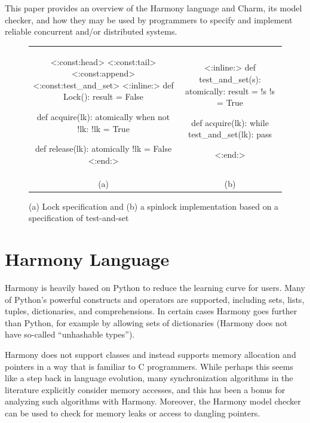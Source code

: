 \documentclass[twocolumn]{article}
\begin{document}
This paper provides an overview of the Harmony language and Charm,
its model checker, and how they may be used by programmers to
specify and implement reliable concurrent and/or distributed systems.

\begin{figure}[h]
\begin{center}
\begin{tabular}{cc}
{\footnotesize
\begin{tcolorbox}[width=0.45\linewidth]
<{:const:head}>
<{:const:tail}>
<{:const:append}>
<{:const:test_and_set}>
<{:inline:}>
def Lock():
    result = False

def acquire(lk):
    atomically when not !lk:
        !lk = True

def release(lk):
    atomically !lk = False
<{:end:}>
\end{tcolorbox}
}
&
{\footnotesize
\begin{tcolorbox}[width=0.45\linewidth]
<{:inline:}>
def test_and_set(s):
    atomically:
        result = !s
        !s = True

def acquire(lk):
    while test_and_set(lk):
        pass

<{:end:}>
\end{tcolorbox}
}
\\
(a) & (b)
\end{tabular}
\end{center}
\caption{(a) Lock specification and (b) a spinlock implementation based on
a specification of test-and-set}
\label{fig:synch}
\end{figure}

\section{Harmony Language}

Harmony is heavily based on Python to reduce the learning curve for
users.  Many of Python's powerful constructs and operators are
supported, including sets, lists, tuples, dictionaries, and
comprehensions.  In certain cases Harmony goes further than Python,
for example by allowing sets of dictionaries (Harmony does not have
so-called ``unhashable types'').

Harmony does not
support classes and instead supports memory allocation and pointers
in a way that is familiar to C programmers.  While perhaps this
seems like a step back in language evolution, many synchronization
algorithms in the literature explicitly consider memory accesses,
and this has been a bonus for analyzing such algorithms with Harmony.
Moreover, the Harmony model checker can be used to check for memory
leaks or access to dangling pointers.
\end{document}
